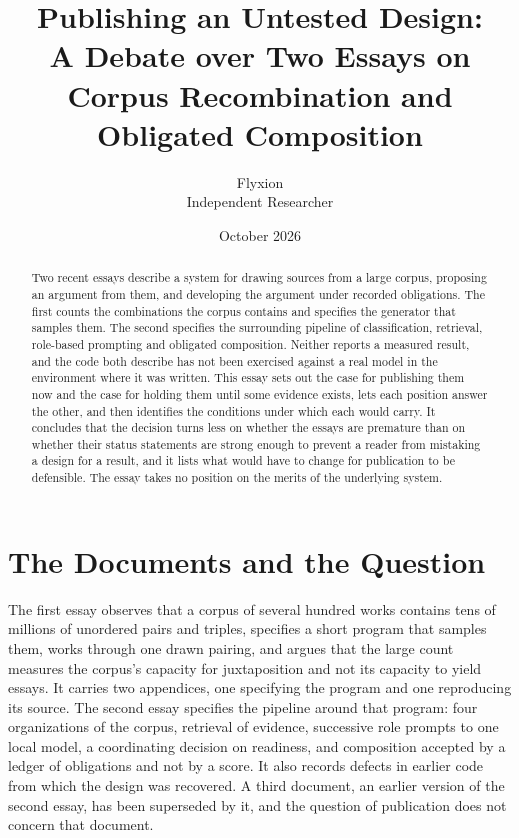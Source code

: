 \documentclass[11pt]{article}
\title{Publishing an Untested Design:\\[0.3em]
\large A Debate over Two Essays on Corpus Recombination and Obligated Composition}
\author{Flyxion\\Independent Researcher}
\date{October 2026}
\begin{document}
\maketitle

\begin{abstract}
\noindent Two recent essays describe a system for drawing sources from a large corpus, proposing an argument from them, and developing the argument under recorded obligations. The first counts the combinations the corpus contains and specifies the generator that samples them. The second specifies the surrounding pipeline of classification, retrieval, role-based prompting and obligated composition. Neither reports a measured result, and the code both describe has not been exercised against a real model in the environment where it was written. This essay sets out the case for publishing them now and the case for holding them until some evidence exists, lets each position answer the other, and then identifies the conditions under which each would carry. It concludes that the decision turns less on whether the essays are premature than on whether their status statements are strong enough to prevent a reader from mistaking a design for a result, and it lists what would have to change for publication to be defensible. The essay takes no position on the merits of the underlying system.
\end{abstract}

\section{The Documents and the Question}

The first essay observes that a corpus of several hundred works contains tens of millions of unordered pairs and triples, specifies a short program that samples them, works through one drawn pairing, and argues that the large count measures the corpus's capacity for juxtaposition and not its capacity to yield essays. It carries two appendices, one specifying the program and one reproducing its source. The second essay specifies the pipeline around that program: four organizations of the corpus, retrieval of evidence, successive role prompts to one local model, a coordinating decision on readiness, and composition accepted by a ledger of obligations and not by a score. It also records defects in earlier code from which the design was recovered. A third document, an earlier version of the second essay, has been superseded by it, and the question of publication does not concern that document.
\end{document}
